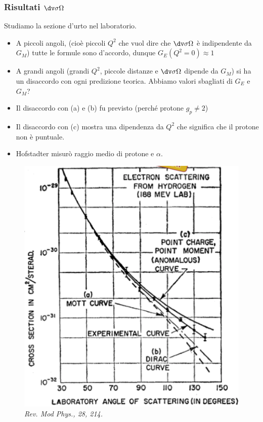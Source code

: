 \subsubsection{Risultati $\dv\sigma\Omega$}
Studiamo la sezione d'urto nel laboratorio.\newline
\noindent
\begin{minipage}[t]{0.48\textwidth}
    \begin{itemize}
        \item A piccoli angoli, (cioè piccoli $Q^2$ che vuol dire che $\dv\sigma\Omega$ è indipendente da $G_M$) tutte le formule sono d'accordo, dunque $G_E(Q^2=0)\approx1$
        \item A grandi angoli (grandi $Q^2$, piccole distanze e $\dv\sigma\Omega$ dipende da $G_M$) si ha un disaccordo con ogni predizione teorica. Abbiamo valori sbagliati di $G_E$ e $G_M$?
        \item Il disaccordo con (a) e (b) fu previsto (perché protone $g_p\neq2$)
        \item Il disaccordo con (c) mostra una dipendenza da $Q^2$ che significa che il protone non è puntuale.
        \item Hofstadter misurò raggio medio di protone e $\alpha$.  
    \end{itemize}
\end{minipage}
\hfill
\begin{minipage}[t]{0.48\textwidth}
    \begin{figure}[H]
        \centering
        \includegraphics[width=\textwidth]{immagini/fig_proton_structure_result.png}
        \caption{\textit{Rev. Mod Phys., 28, 214.}}
    \end{figure}
\end{minipage}
